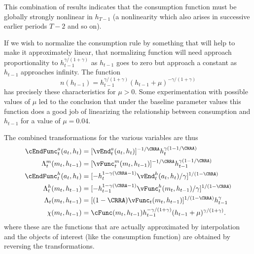 \documentclass[titlepage, headings=optiontotocandhead]{\econtex}
\begin{document}
{  This combination of results indicates that the consumption function
  must be globally strongly nonlinear in $h_{T-1}$ (a nonlinearity which
  also arises in successive earlier periods $T-2$ and so on).

  If we wish to normalize the consumption rule by something that will
  help to make it approximately linear, that normalizing function will
  need approach proportionality to $h_{t-1}^{\gamma/(1+\gamma)}$ as
  $h_{t-1}$ goes to zero but approach a constant as $h_{t-1}$ approaches
  infinity.  The function
  \begin{equation}
    n(h_{t-1}) =
    h_{t-1}^{\gamma/(1+\gamma)}(h_{t-1}+\mu)^{-\gamma/(1+\gamma)}
  \end{equation}
  has precisely these characteristics for $\mu>0$.  Some
  experimentation with possible values of $\mu$ led to the conclusion
  that under the baseline parameter values this function does a good job
  of linearizing the relationship between consumption and $h_{t-1}$ for
  a value of $\mu = 0.04$.

  The combined transformations for the various variables are thus
  \begin{equation}\begin{gathered}\begin{aligned}
        \cEndFunc_{t}^{{a}}({a}_{t},h_{t})        & = [\vEnd_{t}^{{a}}({a}_{t},h_{t})]^{-1/\CRRA} h_{t}^{\gamma(1-1/\CRRA)} \label{eq:vEndstransform} \\
        \Lambda_{t}^{m}({m}_{t},h_{t-1})   & = [{\vFunc}_{t}^{m}({m}_{t},h_{t-1})]^{-1/\CRRA} h_{t-1}^{\gamma(1-1/\CRRA)} \label{eq:vxtransform} \\
        \cEndFunc_{t}^{h}({a}_{t},h_{t})       
        & =                                                  [-h_{t}^{1-\gamma(\CRRA-1)}\vEnd_{t}^{h}({a}_{t},h_{t})/\gamma]^{1/(1-\CRRA)}  \label{eq:vEndhtransform}
        \\      \Lambda_{t}^{h}({m}_{t},h_{t-1})   & = [-h_{t-1}^{1-\gamma(\CRRA-1)}{\vFunc}_{t}^{h}({m}_{t},h_{t-1})/\gamma]^{1/(1-\CRRA)} \label{eq:vhtransform}
        \\      \Lambda_{t}({m}_{t},h_{t-1})       & = [(1-\CRRA)
        {\vFunc}_{t}({m}_{t},h_{t-1})]^{1/(1-\CRRA)} h_{t-1}^{\gamma}\label{eq:vtransform}
        \\  \chi({m}_{t},h_{t-1})       & = \cFunc({m}_{t},h_{t-1})h_{t-1}^{-\gamma/(1+\gamma)}(h_{t-1}+\mu)^{\gamma/(1+\gamma)}.
      \end{aligned}\end{gathered}\end{equation}
  where these are the functions that are actually approximated by
  interpolation and the objects of interest (like the consumption
  function) are obtained by reversing the transformations.

}
\end{document}
